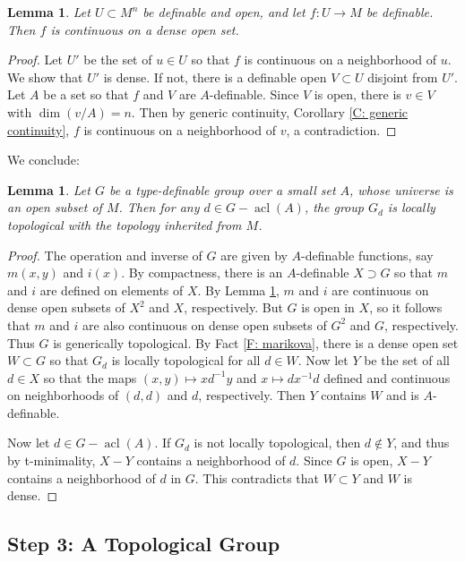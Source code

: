\documentclass{amsart}
\newtheorem{lemma}[theorem]{Lemma}
\theoremstyle{definition}
\newcommand{\acl}{\operatorname{acl}}
\begin{document}
\begin{lemma}\label{L: open dense continuity}
    Let $U\subset M^n$ be definable and open, and let $f:U\rightarrow M$ be definable. Then $f$ is continuous on a dense open set. 
    \end{lemma}
    \begin{proof}
        Let $U'$ be the set of $u\in U$ so that $f$ is continuous on a neighborhood of $u$. We show that $U'$ is dense. If not, there is a definable open $V\subset U$ disjoint from $U'$. Let $A$ be a set so that $f$ and $V$ are $A$-definable. Since $V$ is open, there is $v\in V$ with $\dim(v/A)=n$. Then by generic continuity, Corollary \ref{C: generic continuity}, $f$ is continuous on a neighborhood of $v$, a contradiction.
    \end{proof}

    We conclude:

    \begin{lemma}\label{L: loc top gp}
        Let $G$ be a type-definable group over a small set $A$, whose universe is an open subset of $M$. Then for any $d\in G-\acl(A)$, the group $G_d$ is locally topological with the topology inherited from $M$.
    \end{lemma}
    \begin{proof}
        The operation and inverse of $G$ are given by $A$-definable functions, say $m(x,y)$ and $i(x)$. By compactness, there is an $A$-definable $X\supset G$ so that $m$ and $i$ are defined on elements of $X$. By Lemma \ref{L: open dense continuity}, $m$ and $i$ are continuous on dense open subsets of $X^2$ and $X$, respectively. But $G$ is open in $X$, so it follows that $m$ and $i$ are also continuous on dense open subsets of $G^2$ and $G$, respectively. Thus $G$ is generically topological. By Fact \ref{F: marikova}, there is a dense open set $W\subset G$ so that $G_d$ is locally topological for all $d\in W$. Now let $Y$ be the set of all $d\in X$ so that the maps $(x,y)\mapsto xd^{-1}y$ and $x\mapsto dx^{-1}d$ defined and continuous on neighborhoods of $(d,d)$ and $d$, respectively. Then $Y$ contains $W$ and is $A$-definable.

        Now let $d\in G-\acl(A)$. If $G_d$ is not locally topological, then $d\notin Y$, and thus by t-minimality, $X-Y$ contains a neighborhood of $d$. Since $G$ is open, $X-Y$ contains a neighborhood of $d$ in $G$. This contradicts that $W\subset Y$ and $W$ is dense.
    \end{proof}

    \subsection{Step 3: A Topological Group}
\end{document}
